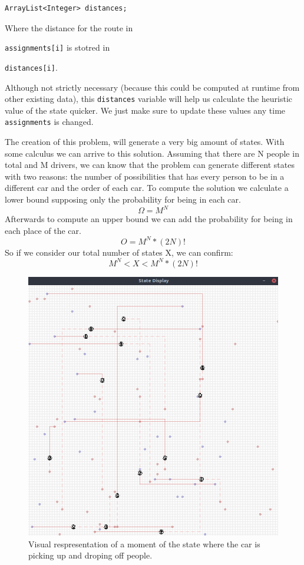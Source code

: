 \documentclass[12]{article}
\begin{document}
\begin{lstlisting}
ArrayList<Integer> distances;
\end{lstlisting}

Where the distance for the route in \raggedright\lstinline{assignments[i]} is stotred in \raggedright\lstinline{distances[i]}.

Although not strictly necessary (because this could be computed at runtime from other existing data), this \lstinline{distances} variable will help us calculate the heuristic value of the state quicker. We just make sure to update these values any time \lstinline{assignments} is changed.

The creation of this problem, will generate a very big amount of states. With some calculus we can arrive to this solution. Assuming that there are N people in total and M drivers, we can know that
the problem can generate different states with two reasons: the number of possibilities that has every person to be in a different car and the order of each car.
To compute the solution we calculate a lower bound supposing only the probability for being in each car.
$$\Omega = M^N$$
Afterwards to compute an upper bound we can add the probability for being in each place of the car.
$$O = M^N*(2N)!$$
So if we consider our total number of states X, we can confirm:
$$M^N < X < M^N*(2N)!$$

\begin{figure}[H]
\captionsetup{justification=centering}
\centering
\includegraphics[scale=0.35]{images/carsMoving.png}
\caption{Visual respresentation of a moment of the state where the car is picking up and droping off people.}
\label{grid}
\end{figure}
\end{document}

